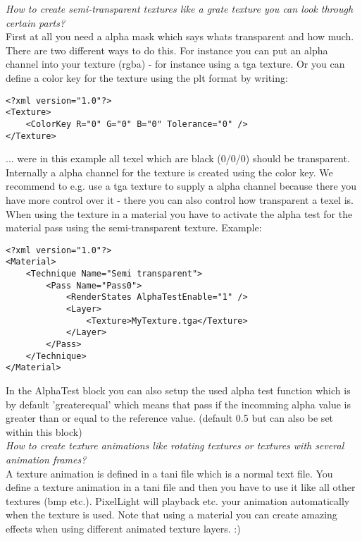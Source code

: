 \emph{How to create semi-transparent textures like a grate texture you can look through certain parts?}\\
First at all you need a alpha mask which says whats transparent and how much.
There are two different ways to do this. For instance you can put an alpha channel into your
texture (rgba) - for instance using a tga texture. Or you can define a color key for the texture
using the plt format by writing:\\

\begin{lstlisting}[caption=plt-file color key]
<?xml version="1.0"?>
<Texture>
	<ColorKey R="0" G="0" B="0" Tolerance="0" />
</Texture>
\end{lstlisting}

... were in this example all texel which are black (0/0/0) should be transparent. Internally a
alpha channel for the texture is created using the color key. We recommend to e.g. use a tga
texture to supply a alpha channel because there you have more control over it - there you can
also control how transparent a texel is.\\
    
When using the texture in a material you have to activate the alpha test for the material pass
using the semi-transparent texture. Example:\\

\begin{lstlisting}[caption=Semi-transparent material]
<?xml version="1.0"?>
<Material>
	<Technique Name="Semi transparent">
		<Pass Name="Pass0">
			<RenderStates AlphaTestEnable="1" />
			<Layer>
				<Texture>MyTexture.tga</Texture>
			</Layer>
		</Pass>
	</Technique>
</Material>
\end{lstlisting}

In the AlphaTest block you can also setup the used alpha test function which is by default 'greaterequal' 
which means that pass if the incomming alpha value is greater than or equal to the reference value.
(default 0.5 but can also be set within this block)\\


\emph{How to create texture animations like rotating textures or textures with several animation frames?}\\
A texture animation is defined in a tani file which is a normal text file. You define a texture
animation in a tani file and then you have to use it like all other textures (bmp etc.). PixelLight
will playback etc. your animation automatically when the texture is used. Note that using a material
you can create amazing effects when using different animated texture layers. :)\\


